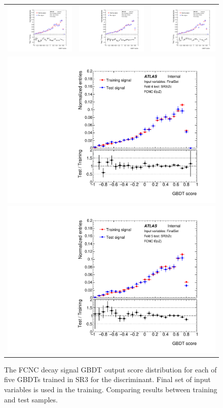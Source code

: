\begin{figure}[!htbp]
	\centering
	\begin{tabular}{ccc}
		\includegraphics[width=.3\textwidth]{Chapters/CH5/figures/SR3_UsingSMT/BDT/FinalSet/GBDT_signal_FinalSet_Fold1} &
		\includegraphics[width=.3\textwidth]{Chapters/CH5/figures/SR3_UsingSMT/BDT/FinalSet/GBDT_signal_FinalSet_Fold2} &
		\includegraphics[width=.3\textwidth]{Chapters/CH5/figures/SR3_UsingSMT/BDT/FinalSet/GBDT_signal_FinalSet_Fold3} \\
		\multicolumn{3}{c}{
			\includegraphics[width=.3\textwidth]{Chapters/CH5/figures/SR3_UsingSMT/BDT/FinalSet/GBDT_signal_FinalSet_Fold4}
			\includegraphics[width=.3\textwidth]{Chapters/CH5/figures/SR3_UsingSMT/BDT/FinalSet/GBDT_signal_FinalSet_Fold5}} \\
	\end{tabular}
	\caption{ The FCNC \ttbar decay signal GBDT output score distribution for each of five GBDTs trained in SR3 for the \Dthree discriminant.
		Final set of input variables is used in the training.
		Comparing results between training and test samples.
	}%
	\label{app:BDT:fig:SR3:GBDTsigFinalSet}
\end{figure}

